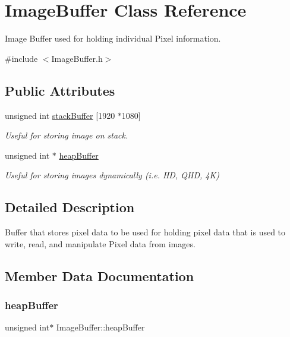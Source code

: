 \hypertarget{structImageBuffer}{}\section{Image\+Buffer Class Reference}
\label{structImageBuffer}


Image Buffer used for holding individual Pixel information.  




{\ttfamily \#include $<$Image\+Buffer.\+h$>$}

\subsection*{Public Attributes}
\begin{DoxyCompactItemize}
\item 
unsigned int \hyperlink{structImageBuffer_a36f4b5945877816b613e13100d8954c5}{stack\+Buffer} \mbox{[}1920 $\ast$1080\mbox{]}
\begin{DoxyCompactList}\small\item\em Useful for storing image on stack. \end{DoxyCompactList}\item 
unsigned int $\ast$ \hyperlink{structImageBuffer_aac57281a2a49e9771706de0ffbe8c001}{heap\+Buffer}
\begin{DoxyCompactList}\small\item\em Useful for storing images dynamically (i.\+e. HD, Q\+HD, 4K) \end{DoxyCompactList}\end{DoxyCompactItemize}


\subsection{Detailed Description}
Buffer that stores pixel data to be used for holding pixel data that is used to write, read, and manipulate Pixel data from images. 

\subsection{Member Data Documentation}
\mbox{\label{structImageBuffer_aac57281a2a49e9771706de0ffbe8c001}} 
\subsubsection{\texorpdfstring{heap\+Buffer}{heapBuffer}}
{\footnotesize\ttfamily unsigned int$\ast$ Image\+Buffer\+::heap\+Buffer}

